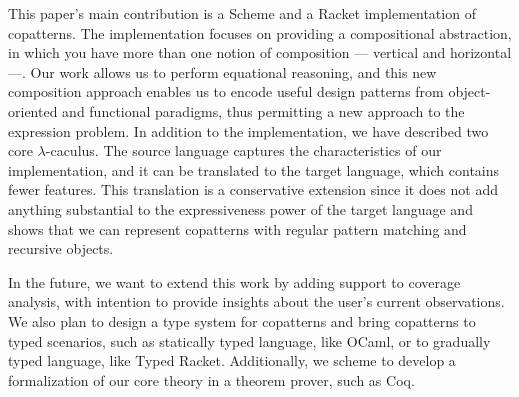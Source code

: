 This paper's main contribution is a Scheme and a Racket implementation of copatterns.
The implementation focuses on providing a compositional abstraction, in which you have more than one notion of composition --- vertical and horizontal ---.
Our work allows us to perform equational reasoning, and this new composition approach enables us to encode useful design patterns from object-oriented and functional paradigms, thus permitting a new approach to the expression problem.
In addition to the implementation, we have described two core $\lambda$-caculus. The source language captures the characteristics of our implementation, and it can be translated to the target language, which contains fewer features.
This translation is a conservative extension since it does not add anything substantial to the expressiveness power of the target language and shows that we can represent copatterns with regular pattern matching and recursive objects.

In the future, we want to extend this work by adding support to coverage analysis, with intention to provide insights about the user's current observations.
We also plan to design a type system for copatterns and bring copatterns to typed scenarios, such as statically typed language, like OCaml, or to gradually typed language, like Typed Racket.
Additionally, we scheme to develop a formalization of our core theory in a theorem prover, such as Coq.
